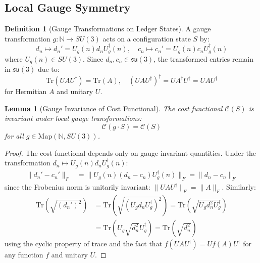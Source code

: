 \documentclass[11pt]{article}
\numberwithin{equation}{section}
\newtheorem{lemma}[theorem]{Lemma}
\theoremstyle{definition}
\newtheorem{definition}[theorem]{Definition}
\theoremstyle{remark}
\begin{document}
\subsection{Local Gauge Symmetry}

\begin{definition}[Gauge Transformations on Ledger States]
A gauge transformation $g: \mathbb{N} \to SU(3)$ acts on a configuration state $S$ by:
\begin{equation}
d_n \mapsto d_n' = U_g(n) d_n U_g^\dagger(n), \quad c_n \mapsto c_n' = U_g(n) c_n U_g^\dagger(n)
\end{equation}
where $U_g(n) \in SU(3)$. Since $d_n, c_n \in \mathfrak{su}(3)$, the transformed entries remain in $\mathfrak{su}(3)$ due to:
\begin{equation}
\text{Tr}(U A U^\dagger) = \text{Tr}(A), \quad (U A U^\dagger)^\dagger = U A^\dagger U^\dagger = U A U^\dagger
\end{equation}
for Hermitian $A$ and unitary $U$.
\end{definition}

\begin{lemma}[Gauge Invariance of Cost Functional]
The cost functional $\mathcal{C}(S)$ is invariant under local gauge transformations:
\begin{equation}
\mathcal{C}(g \cdot S) = \mathcal{C}(S)
\end{equation}
for all $g \in \text{Map}(\mathbb{N}, SU(3))$.
\end{lemma}

\begin{proof}
The cost functional depends only on gauge-invariant quantities. Under the transformation $d_n \mapsto U_g(n) d_n U_g^\dagger(n)$:
\begin{align}
\|d_n' - c_n'\|_F &= \|U_g(n)(d_n - c_n)U_g^\dagger(n)\|_F = \|d_n - c_n\|_F
\end{align}
since the Frobenius norm is unitarily invariant: $\|UAU^\dagger\|_F = \|A\|_F$. Similarly:
\begin{align}
\text{Tr}(\sqrt{(d_n')^2}) &= \text{Tr}(\sqrt{(U_g d_n U_g^\dagger)^2}) = \text{Tr}(\sqrt{U_g d_n^2 U_g^\dagger}) \\
&= \text{Tr}(U_g \sqrt{d_n^2} U_g^\dagger) = \text{Tr}(\sqrt{d_n^2})
\end{align}
using the cyclic property of trace and the fact that $f(UAU^\dagger) = Uf(A)U^\dagger$ for any function $f$ and unitary $U$.
\end{proof}
\end{document}
